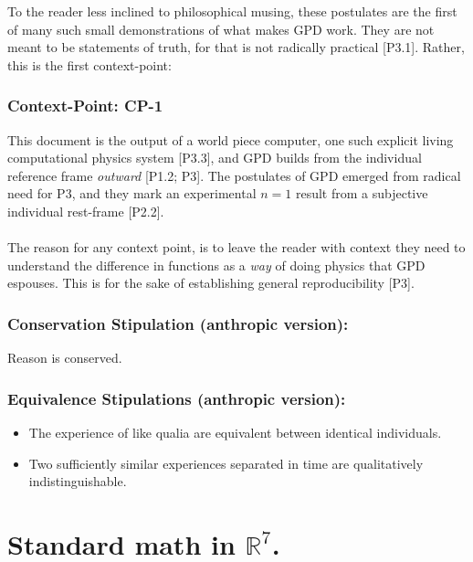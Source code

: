 \documentclass{article}
\begin{document}
\noindent To the reader less inclined to philosophical musing, these postulates are the first of many such small demonstrations of what makes GPD work. They are not meant to be statements of truth, for that is not radically practical [P3.1]. Rather, this is the first context-point:

\subsubsection*{Context-Point: CP-1}
{\footnotesize This document is the output of a world piece computer, one such explicit living computational physics system [P3.3], and GPD builds from the individual reference frame {\em outward} [P1.2; P3]. The postulates of GPD emerged from radical need for P3, and they mark an experimental $n=1$ result from a subjective individual rest-frame [P2.2].}\\
\\
\noindent The reason for any context point, is to leave the reader with context they need to understand the difference in functions as a {\em way} of doing physics that GPD espouses. This is for the sake of establishing general reproducibility [P3].



\subsubsection*{Conservation Stipulation (anthropic version):}
\noindent Reason is conserved.
\noindent 

\subsubsection*{Equivalence Stipulations (anthropic version):}
\begin{itemize}
\item[. [SE1.] The experience of like qualia are equivalent between identical individuals.
\item[. [SE2.] Two sufficiently similar experiences separated in time are qualitatively indistinguishable.
\end{itemize}



\clearpage

\section*{Standard math in $\mathbb{R}^7$.}

\newcommand{\sumexcl}{\mathop{\ooalign{$\sum$\cr\hidewidth\kern-0.5em\raisebox{-2ex}{\scalebox{1}[2.5]{$!$}}\hidewidth\cr}}}
\end{document}
